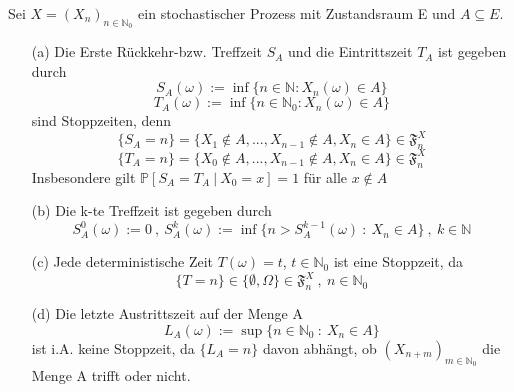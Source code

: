 Sei $X=(X_{n})_{n \in \mathbb{N}_{0}}$ ein stochastischer Prozess mit Zustandsraum E und $A \subseteq E$.
\begin{itemize}
\item[(a)] Die Erste Rückkehr-bzw. Treffzeit $S_{A}$ und die Eintrittszeit $T_{A}$ ist gegeben durch 
\begin{equation*}
S_{A}(\omega) := \inf \lbrace n \in \mathbb{N} : X_{n}(\omega) \in A \rbrace
\end{equation*}
\begin{equation*}
T_{A}(\omega) := \inf \lbrace n \in \mathbb{N}_{0} : X_{n}(\omega) \in A \rbrace
\end{equation*}
sind Stoppzeiten, denn
\begin{equation*}
\lbrace S_{A} = n \rbrace = \lbrace X_{1} \notin A,...,X_{n-1} \notin A, X_{n} \in A  \rbrace \in \mathfrak{F}_{n}^{X}
\end{equation*}
\begin{equation*}
\lbrace T_{A} = n \rbrace = \lbrace X_{0} \notin A,...,X_{n-1} \notin A, X_{n} \in A  \rbrace \in \mathfrak{F}_{n}^{X}
\end{equation*}
Insbesondere gilt $\mathbb{P}[S_{A} = T_{A} \: | \: X_{0} = x] = 1$ für alle $x \notin A$
\item[(b)] Die k-te Treffzeit ist gegeben durch 
\begin{equation*}
S_{A}^{0}(\omega) := 0 \: , \: S_{A}^{k}(\omega) := \inf \lbrace n> S_{A}^{k-1}(\omega) \: : \: X_{n} \in A \rbrace \: , \: k \in \mathbb{N}
\end{equation*}
\item[(c)] Jede deterministische Zeit $T(\omega) = t$, $t \in \mathbb{N}_{0}$ ist eine Stoppzeit, da
\begin{equation*}
\lbrace T = n \rbrace \in \lbrace \emptyset, \Omega \rbrace  \in \mathfrak{F}_{n}^{X} \:,\: n \in \mathbb{N}_{0} 
\end{equation*}
\item[(d)] Die letzte Austrittszeit auf der Menge A 
\begin{equation*}
L_{A}(\omega) := \sup \lbrace n \in \mathbb{N}_{0} \: : \: X_{n} \in A \rbrace
\end{equation*}
ist i.A. keine Stoppzeit, da $\lbrace L_{A} = n \rbrace$ davon abhängt, ob $(X_{n+m})_{m \in \mathbb{N}_{0}}$ die Menge A trifft oder nicht.
\end{itemize}